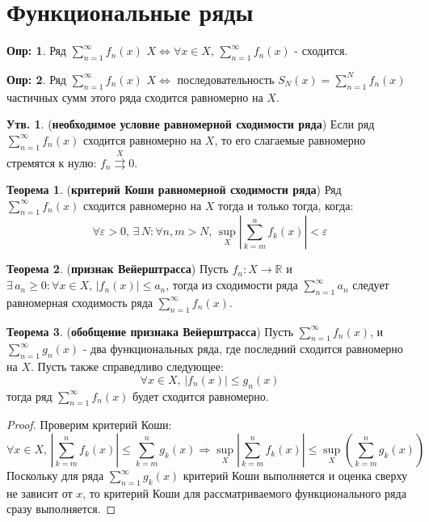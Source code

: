\documentclass[12pt]{article}
\newcommand{\RN}[1]{%
	\textup{\uppercase\expandafter{\romannumeral#1}}%
}
\newcommand{\MR}{\mathbb{R}}
\newcommand{\VE}{\varepsilon}
\theoremstyle{definition}
\newtheorem{defn}{Опр:}
\newtheorem{prop}{Утв.}
\newtheorem{theorem}{Теорема}
\newcommand{\ddsum}[2]{\displaystyle\sum\limits_{#1}^{#2}}
\newcommand{\uconv}[1]{\overset{#1}{\rightrightarrows}}
\begin{document}
\lhead{Математический анализ - \RN{3}}
\section*{Функциональные ряды}
\begin{defn}
	Ряд $\displaystyle \sum\limits_{n = 1}^{\infty}f_n(x)$  $X \Leftrightarrow \forall x \in X, \, \displaystyle \sum\limits_{n = 1}^{\infty}f_n(x)$ - сходится.
\end{defn}
\begin{defn}
	Ряд $\displaystyle \sum\limits_{n = 1}^{\infty}f_n(x)$  $X \Leftrightarrow $ последовательность $S_N(x) = \displaystyle\sum\limits_{n = 1}^N f_n(x)$ частичных сумм этого ряда  сходится равномерно на $X$.
\end{defn}
\begin{prop}(\textbf{необходимое условие равномерной сходимости ряда})
	Если ряд $\displaystyle \sum\limits_{n = 1}^{\infty}f_n(x)$ сходится равномерно на $X$, то его слагаемые равномерно стремятся к нулю: $f_n \uconv{X}0$.
\end{prop}

\begin{theorem}(\textbf{критерий Коши равномерной сходимости ряда})
	Ряд $\displaystyle \sum\limits_{n = 1}^{\infty}f_n(x)$ сходится равномерно на $X$ тогда и только тогда, когда:
	$$
		\forall \VE > 0, \, \exists \, N \colon \forall n,m > N, \, \sup\limits_{X}\left| \sum\limits_{k = m}^{n} f_k(x)\right| < \VE
	$$
\end{theorem}
\begin{theorem}(\textbf{признак Вейерштрасса})
	Пусть $f_n \colon X \to \MR$ и $\exists \, a_n \geq 0 \colon \forall x \in X, \, |f_n(x)| \leq a_n$, тогда из сходимости ряда $\displaystyle \sum\limits_{n = 1}^{\infty}a_n$ следует равномерная сходимость ряда $\displaystyle \sum\limits_{n = 1}^{\infty}f_n(x)$.
\end{theorem}

\begin{theorem}(\textbf{обобщение признака Вейерштрасса})
	Пусть $\ddsum{n = 1}{\infty}f_n(x)$, и $\ddsum{n=1}{\infty}g_n(x)$ - два функциональных ряда, где последний сходится равномерно на $X$. Пусть также справедливо следующее: 
	$$
		\forall x \in X,\, |f_n(x)| \leq g_n(x)
	$$ 
	тогда ряд $\ddsum{n = 1}{\infty}f_n(x)$ будет сходится равномерно.
\end{theorem}
\begin{proof}
	Проверим критерий Коши:
	$$
		\forall x \in X, \, \left| \sum\limits_{k = m}^{n} f_k(x)\right| 	\leq \sum\limits_{k = m}^n g_k(x) \Rightarrow \sup\limits_{X}\left| \sum\limits_{k = m}^{n} f_k(x)\right| \leq \sup\limits_{X}\left(\sum\limits_{k = m}^n g_k(x)\right)
	$$
	Поскольку для ряда $\displaystyle \sum\limits_{n = 1}^{\infty}g_k(x)$ критерий Коши выполняется и оценка сверху не зависит от $x$, то критерий Коши для рассматриваемого функционального ряда сразу выполняется.
\end{proof}
\end{document}
